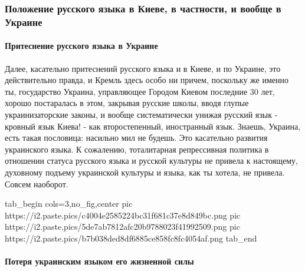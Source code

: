  
 
 
 
 

\subsubsection{Положение русского языка в Киеве, в частности, и вообще в Украине}


\paragraph{Притеснение русского языка в Украине}

Далее, касательно притеснений русского языка и в Киеве, и по Украине, это
действительно правда, и Кремль здесь особо ни причем, поскольку же именно ты,
государство Украина, управляющее Городом Киевом последние 30 лет, хорошо
постаралась в этом, закрывая русские школы, вводя глупые украинизаторские
законы, и вообще систематически унижая русский язык - кровный язык Киева! - как
второстепенный, иностранный язык.  Знаешь, Украина, есть такая пословица:
насильно мил не будешь. Это касательно развития украинского языка. К сожалению,
тоталитарная репрессивная политика в отношении статуса русского языка и русской
культуры не привела к настоящему, духовному подъему украинской культуры и
языка, как ты хотела, не привела. Совсем наоборот.

\ifcmt
  tab_begin cols=3,no_fig,center
     pic https://i2.paste.pics/c4004e2585224bc31f681c37e8d849bc.png
     pic https://i2.paste.pics/5de7ab7812afc20b9788023f41992509.png
     pic https://i2.paste.pics/b7b038ded8df6885ce858fc8fc4054af.png
  tab_end
\fi

\paragraph{Потеря украинским языком его жизненной силы}

